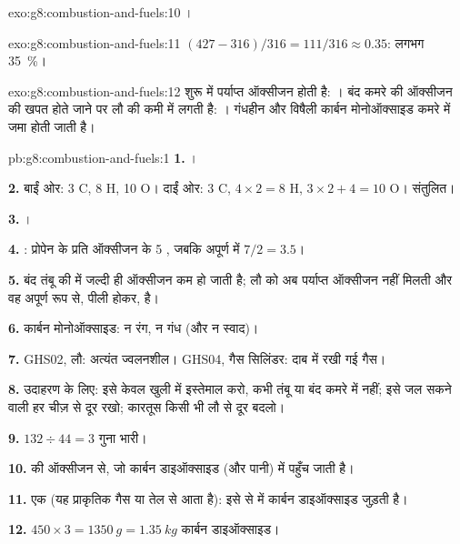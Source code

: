 \begin{solution}{exo:g8:combustion-and-fuels:10}
।
\end{solution}

\begin{solution}{exo:g8:combustion-and-fuels:11}
$(427 - 316)/316 = 111/316 \approx 0.35$: लगभग \qty{35}{\percent}।
\end{solution}

\begin{solution}{exo:g8:combustion-and-fuels:12}
शुरू में पर्याप्त ऑक्सीजन होती है: । बंद कमरे की
ऑक्सीजन की खपत होते जाने पर लौ  की कमी में  लगती है:
। गंधहीन और विषैली कार्बन मोनोऑक्साइड
कमरे में जमा होती जाती है।
\end{solution}

\begin{solution}{pb:g8:combustion-and-fuels:1}
\textbf{1.} ।

\textbf{2.} बाईं ओर: 3 C, 8 H, 10 O। दाईं ओर: 3 C, $4 \times 2 = 8$ H,
$3 \times 2 + 4 = 10$ O। संतुलित।

\textbf{3.} ।

\textbf{4.} : प्रोपेन के प्रति  ऑक्सीजन के 5 ,
जबकि अपूर्ण में $7/2 = 3.5$।

\textbf{5.} बंद तंबू की  में जल्दी ही ऑक्सीजन कम हो जाती है; लौ को अब
पर्याप्त ऑक्सीजन नहीं मिलती और वह अपूर्ण रूप से, पीली होकर,  है।

\textbf{6.} कार्बन मोनोऑक्साइड: न रंग, न गंध (और न स्वाद)।

\textbf{7.} GHS02, लौ: अत्यंत ज्वलनशील। GHS04, गैस
सिलिंडर: दाब में रखी गई गैस।

\textbf{8.} उदाहरण के लिए: इसे केवल खुली  में इस्तेमाल करो, कभी तंबू या
बंद कमरे में नहीं; इसे जल सकने वाली हर चीज़ से दूर रखो; कारतूस किसी भी लौ से
दूर बदलो।

\textbf{9.} $132 \div 44 = 3$ गुना भारी।

\textbf{10.}  की ऑक्सीजन से, जो कार्बन डाइऑक्साइड (और पानी) में
पहुँच जाती है।

\textbf{11.} एक  (यह प्राकृतिक गैस या तेल से आता है): इसे 
से  में कार्बन डाइऑक्साइड जुड़ती है।

\textbf{12.} $450 \times 3 = \qty{1350}{g} = \qty{1.35}{kg}$ कार्बन
डाइऑक्साइड।
\end{solution}
